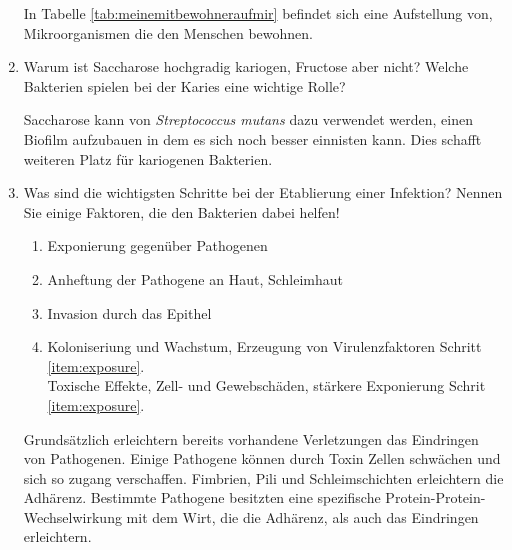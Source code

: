 \begin{enumerate}
		In Tabelle \ref{tab:meinemitbewohneraufmir} befindet sich eine Aufstellung von,
		Mikroorganismen die den Menschen bewohnen.

	\item Warum ist Saccharose hochgradig kariogen, Fructose aber nicht? Welche Bakterien spielen bei der Karies eine wichtige Rolle?

		Saccharose kann von \emph{Streptococcus mutans} dazu verwendet werden,
		einen Biofilm aufzubauen in dem es sich noch besser einnisten kann.
		Dies schafft weiteren Platz für kariogenen Bakterien.

	\item Was sind die wichtigsten Schritte bei der Etablierung einer Infektion? Nennen Sie einige Faktoren, die den Bakterien dabei helfen!

		\begin{enumerate}[label=\arabic*)]
			\item Exponierung gegenüber Pathogenen
			\label{item:exposure}
			\item Anheftung der Pathogene an Haut, Schleimhaut
			\item Invasion durch das Epithel
			\item Koloniseriung und Wachstum, Erzeugung von Virulenzfaktoren
				\textrightarrow Schritt \ref{item:exposure}.\\
				\textrightarrow Toxische Effekte, Zell- und Gewebschäden, stärkere Exponierung \textrightarrow Schrit  \ref{item:exposure}.\\
		\end{enumerate}

		Grundsätzlich erleichtern bereits vorhandene Verletzungen das Eindringen von Pathogenen.
		Einige Pathogene können durch Toxin Zellen schwächen und sich so zugang verschaffen.
		Fimbrien, Pili und Schleimschichten erleichtern die Adhärenz.
		Bestimmte Pathogene besitzten eine spezifische Protein-Protein-Wechselwirkung mit dem Wirt,
		die die Adhärenz,
		als auch das Eindringen erleichtern.
\end{enumerate}
